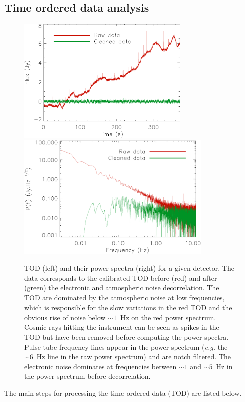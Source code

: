 \subsection{Time ordered data analysis}
 \label{sec:TOI_ana}
 	\begin{figure}
	\centering
	\includegraphics[height=6cm]{Figure/TOI_real}
	\hspace*{0.5cm}
	\includegraphics[height=6cm]{Figure/PS_real}
	\caption{TOD (left) and their power spectra (right) for a given detector. The data corresponds to the calibrated TOD before (red) and after (green) the electronic and atmospheric noise decorrelation. The TOD are dominated by the atmospheric noise at low frequencies, which is responsible for the slow variations in the red TOD and the obvious rise of noise below $\sim 1$~Hz on the red power spectrum. Cosmic rays hitting the instrument can be seen as spikes in the TOD but have been removed before computing the power spectra. Pulse tube frequency lines appear in the power spectrum ({\it e.g.} the $\sim 6$~Hz line in the raw power spectrum) and are notch filtered. The electronic noise dominates at frequencies between $\sim 1$ and $\sim 5$~Hz in the power spectrum before decorrelation.} \label{fig:TOI_PS_real}
	\end{figure}
The main steps for processing the time ordered data (TOD) are listed below.
